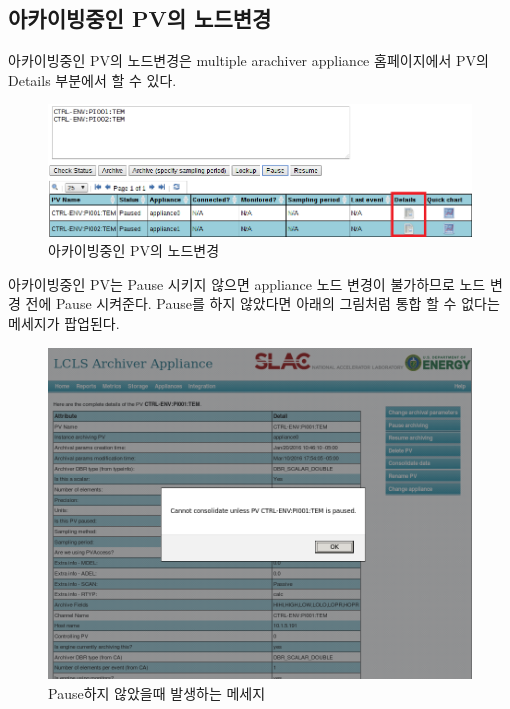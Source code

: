 \documentclass[11pt
  , a4paper
  , article
  , oneside
]{memoir}
\begin{document}
\subsection{아카이빙중인 PV의 노드변경}
아카이빙중인 PV의 노드변경은 multiple arachiver appliance 홈페이지에서 PV의 Details 부분에서 할 수 있다.
\clearpage
\begin{figure}[h!]
	\centering
	\includegraphics[width=1\textwidth, height=0.2\textheight]{./images/Selection_07.png}
	\caption{아카이빙중인 PV의 노드변경}
\end{figure}

아카이빙중인 PV는 Pause 시키지 않으면 appliance 노드 변경이 불가하므로 노드 변경 전에 Pause 시켜준다. Pause를 하지 않았다면 아래의 그림처럼 통합 할 수 없다는 메세지가 팝업된다.
\begin{figure}[h!]
	\centering
	\includegraphics[width=1\textwidth, height=0.5\textheight]{./images/Selection_006.png}
	\caption{Pause하지 않았을때 발생하는 메세지}
\end{figure}
\end{document}
